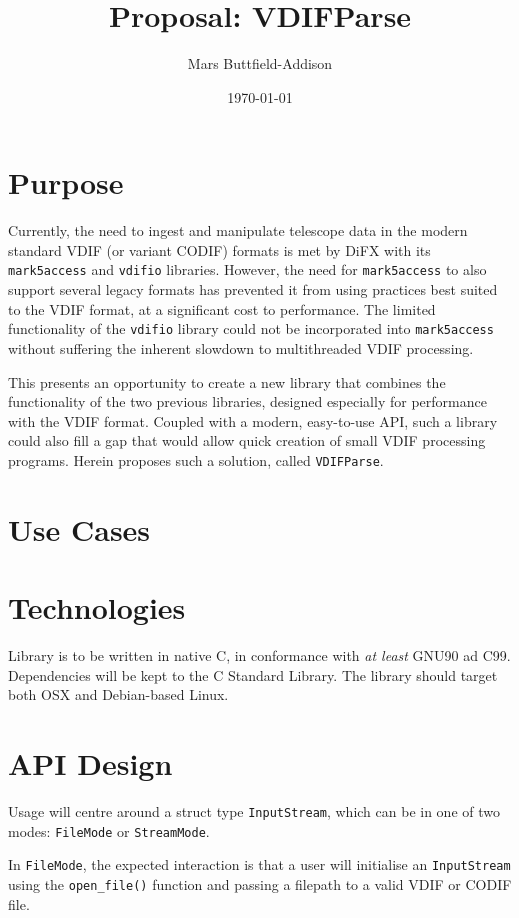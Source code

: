 \documentclass[11pt]{article}
\title{Proposal: VDIFParse}
\author{Mars Buttfield-Addison}
\date{\today}
\begin{document}
\maketitle

\section{Purpose}

Currently, the need to ingest and manipulate telescope data in the modern standard VDIF (or variant CODIF) formats is met by DiFX with its \texttt{mark5access} and \texttt{vdifio} libraries. However, the need for \texttt{mark5access} to also support several legacy formats has prevented it from using practices best suited to the VDIF format, at a significant cost to performance. The limited functionality of the \texttt{vdifio} library could not be incorporated into \texttt{mark5access} without suffering the inherent slowdown to multithreaded VDIF processing.

This presents an opportunity to create a new library that combines the functionality of the two previous libraries, designed especially for performance with the VDIF format. Coupled with a modern, easy-to-use API, such a library could also fill a gap that would allow quick creation of small VDIF processing programs. Herein proposes such a solution, called \texttt{VDIFParse}.

\section{Use Cases}

\section{Technologies}

Library is to be written in native C, in conformance with \textit{at least} GNU90 ad C99. Dependencies will be kept to the C Standard Library. The library should target both OSX and Debian-based Linux.

\section{API Design}

Usage will centre around a struct type \lstinline{InputStream}, which can be in one of two modes: \lstinline{FileMode} or \lstinline{StreamMode}.

In \lstinline{FileMode}, the expected interaction is that a user will initialise an \lstinline{InputStream} using the \lstinline{open_file()} function and passing a filepath to a valid VDIF or CODIF file.
\end{document}
